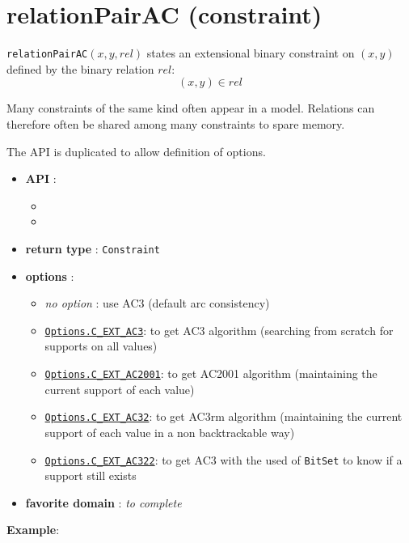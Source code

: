 \label{relationpairac}
\hypertarget{relationpairac}{}

\section{relationPairAC (constraint)}\label{relationpairac:relationpairacconstraint}\hypertarget{relationpairac:relationpairacconstraint}{}
\begin{notedef}
  \texttt{relationPairAC}$(x,y,rel)$ states an extensional binary constraint on $(x,y)$ defined by the binary relation $rel$:
$$(x,y)\in rel$$
\end{notedef}
Many constraints of the same kind often appear in a model. Relations can therefore often be shared among many constraints to spare memory.

The API is duplicated to allow definition of options.

\begin{itemize}
	\item \textbf{API} :
	\begin{itemize}
		\item {}
		\item {}
	\end{itemize}
	\item \textbf{return type} : \texttt{Constraint}
	\item \textbf{options} :
	\begin{itemize}
		\item \emph{no option} : use AC3 (default arc consistency)
		\item \hyperlink{cext3:cext3options}{\tt Options.C\_EXT\_AC3}: to get AC3 algorithm (searching from scratch for supports on all values)
		\item \hyperlink{cext2001:cext2001options}{\tt Options.C\_EXT\_AC2001}: to get AC2001 algorithm (maintaining the current support of each value)
		\item \hyperlink{cext32:cext32options}{\tt Options.C\_EXT\_AC32}: to get AC3rm algorithm (maintaining the current support of each value in a non backtrackable way)
		\item \hyperlink{cext322:cext322options}{\tt Options.C\_EXT\_AC322}: to get AC3 with the used of \texttt{BitSet} to know if a support still exists
	\end{itemize}
	\item \textbf{favorite domain} : \emph{to complete}
\end{itemize}

\textbf{Example}:



